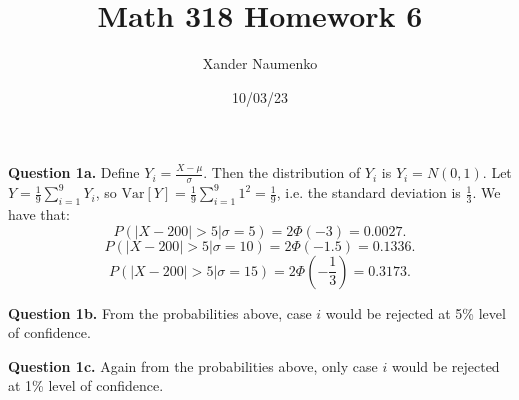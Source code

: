 \documentclass[letterpaper, reqno,11pt]{article}
\begin{document}
\title{Math 318 Homework 6}
\date{10/03/23}
\author{Xander Naumenko}
\maketitle

{\medskip\noindent\bf Question 1a.} Define $Y_i=\frac{X-\mu}{\sigma}$. Then the distribution of $Y_i$ is $Y_i=N(0,1)$. Let $Y=\frac{1}{9}\sum_{i=1}^{9}Y_i$, so $\text{Var}[Y]=\frac{1}{9}\sum_{i=1}^{9}1^2=\frac{1}{9}$, i.e. the standard deviation is $\frac{1}{3}$. We have that: 
\[
P(|X-200| >5|\sigma=5)=2\Phi(-3)=0.0027
.\]
\[
P(|X-200| >5|\sigma=10)=2\Phi(-1.5)=0.1336
.\]
\[
P(|X-200| >5|\sigma=15)=2\Phi(-\frac{1}{3})=0.3173
.\]

{\medskip\noindent\bf Question 1b.} From the probabilities above, case $i$ would be rejected at 5\% level of confidence. 

{\medskip\noindent\bf Question 1c.} Again from the probabilities above, only case $i$ would be rejected at 1\% level of confidence. 
\end{document}
